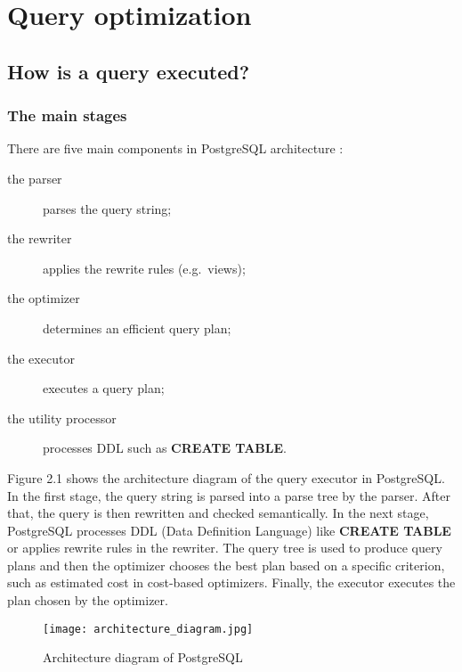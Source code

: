
\chapter{Query optimization}\label{chapter:query optimization}

\section{How is a query executed?}

\subsection{The main stages}

There are five main components in PostgreSQL architecture
\cite{pg_internals}:

\begin{description}
    \item[the parser]  parses the query string;
    \item[the rewriter] applies the rewrite rules (e.g.\ views);
    \item[the optimizer] determines an efficient query plan;
    \item[the executor] executes a query plan;
    \item[the utility processor] processes DDL such as {\bfseries CREATE TABLE}.
\end{description}

Figure 2.1 shows the architecture diagram of the query executor in PostgreSQL.
In the first stage, the query string is parsed into a parse tree by the parser.
After that, the query is then rewritten and checked semantically. In the next
stage, PostgreSQL processes DDL (Data Definition Language) like {\bfseries
CREATE TABLE} or applies rewrite rules in the rewriter. The query tree is used to
produce query plans and then the optimizer chooses the best plan based on a
specific criterion, such as estimated cost in cost-based optimizers. Finally, the
executor executes the plan chosen by the optimizer.

\begin{figure}[H]
    \centering
    \texttt{[image: architecture\_diagram.jpg]}
    \caption{Architecture diagram of PostgreSQL}
\end{figure}


